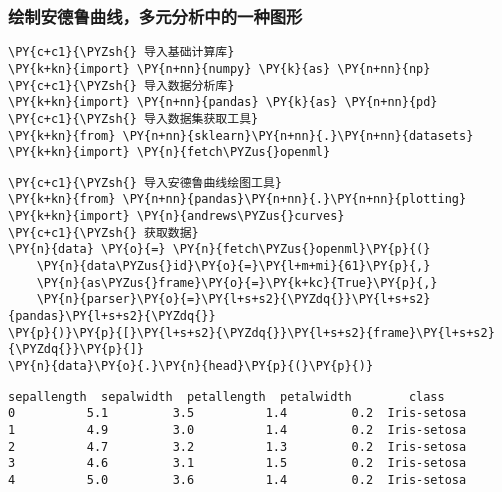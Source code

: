     \hypertarget{ux7ed8ux5236ux5b89ux5fb7ux9c81ux66f2ux7ebfux591aux5143ux5206ux6790ux4e2dux7684ux4e00ux79cdux56feux5f62}{%
\subsubsection{绘制安德鲁曲线，多元分析中的一种图形}\label{ux7ed8ux5236ux5b89ux5fb7ux9c81ux66f2ux7ebfux591aux5143ux5206ux6790ux4e2dux7684ux4e00ux79cdux56feux5f62}}

    \begin{tcolorbox}[breakable, size=fbox, boxrule=1pt, pad at break*=1mm,colback=cellbackground, colframe=cellborder]
\begin{Verbatim}[commandchars=\\\{\}]
\PY{c+c1}{\PYZsh{} 导入基础计算库}
\PY{k+kn}{import} \PY{n+nn}{numpy} \PY{k}{as} \PY{n+nn}{np}
\PY{c+c1}{\PYZsh{} 导入数据分析库}
\PY{k+kn}{import} \PY{n+nn}{pandas} \PY{k}{as} \PY{n+nn}{pd}
\PY{c+c1}{\PYZsh{} 导入数据集获取工具}
\PY{k+kn}{from} \PY{n+nn}{sklearn}\PY{n+nn}{.}\PY{n+nn}{datasets} \PY{k+kn}{import} \PY{n}{fetch\PYZus{}openml}
\end{Verbatim}
\end{tcolorbox}

    \begin{tcolorbox}[breakable, size=fbox, boxrule=1pt, pad at break*=1mm,colback=cellbackground, colframe=cellborder]
\begin{Verbatim}[commandchars=\\\{\}]
\PY{c+c1}{\PYZsh{} 导入安德鲁曲线绘图工具}
\PY{k+kn}{from} \PY{n+nn}{pandas}\PY{n+nn}{.}\PY{n+nn}{plotting} \PY{k+kn}{import} \PY{n}{andrews\PYZus{}curves}
\PY{c+c1}{\PYZsh{} 获取数据}
\PY{n}{data} \PY{o}{=} \PY{n}{fetch\PYZus{}openml}\PY{p}{(}
    \PY{n}{data\PYZus{}id}\PY{o}{=}\PY{l+m+mi}{61}\PY{p}{,}
    \PY{n}{as\PYZus{}frame}\PY{o}{=}\PY{k+kc}{True}\PY{p}{,}
    \PY{n}{parser}\PY{o}{=}\PY{l+s+s2}{\PYZdq{}}\PY{l+s+s2}{pandas}\PY{l+s+s2}{\PYZdq{}}
\PY{p}{)}\PY{p}{[}\PY{l+s+s2}{\PYZdq{}}\PY{l+s+s2}{frame}\PY{l+s+s2}{\PYZdq{}}\PY{p}{]}
\PY{n}{data}\PY{o}{.}\PY{n}{head}\PY{p}{(}\PY{p}{)}
\end{Verbatim}
\end{tcolorbox}

            \begin{tcolorbox}[breakable, size=fbox, boxrule=.5pt, pad at break*=1mm, opacityfill=0]
\begin{Verbatim}[commandchars=\\\{\}]
   sepallength  sepalwidth  petallength  petalwidth        class
0          5.1         3.5          1.4         0.2  Iris-setosa
1          4.9         3.0          1.4         0.2  Iris-setosa
2          4.7         3.2          1.3         0.2  Iris-setosa
3          4.6         3.1          1.5         0.2  Iris-setosa
4          5.0         3.6          1.4         0.2  Iris-setosa
\end{Verbatim}
\end{tcolorbox}
        
